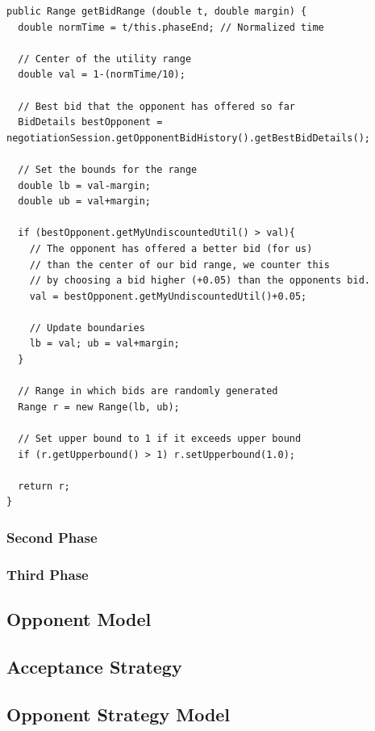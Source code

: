 \documentclass[a4paper,10pt]{article}
\begin{document}
\begin{lstlisting}[caption=Code for calculating bid range as function of normalized time, label=code:getrangefunctionfirstphase]
public Range getBidRange (double t, double margin) {
  double normTime = t/this.phaseEnd; // Normalized time
  
  // Center of the utility range
  double val = 1-(normTime/10);
  
  // Best bid that the opponent has offered so far
  BidDetails bestOpponent = negotiationSession.getOpponentBidHistory().getBestBidDetails();
  
  // Set the bounds for the range
  double lb = val-margin;
  double ub = val+margin;
  
  if (bestOpponent.getMyUndiscountedUtil() > val){
    // The opponent has offered a better bid (for us)
    // than the center of our bid range, we counter this
    // by choosing a bid higher (+0.05) than the opponents bid.
    val = bestOpponent.getMyUndiscountedUtil()+0.05;
    
    // Update boundaries
    lb = val; ub = val+margin;
  }
  
  // Range in which bids are randomly generated
  Range r = new Range(lb, ub); 
  
  // Set upper bound to 1 if it exceeds upper bound
  if (r.getUpperbound() > 1) r.setUpperbound(1.0);
  
  return r;
}
\end{lstlisting}

\subsubsection{Second Phase}

\subsubsection{Third Phase}



\subsection{Opponent Model}
\label{sec:strategyOM}

\subsection{Acceptance Strategy}
\label{sec:strategyAS}

\subsection{Opponent Strategy Model}
\label{sec:strategyOMS}
\end{document}
